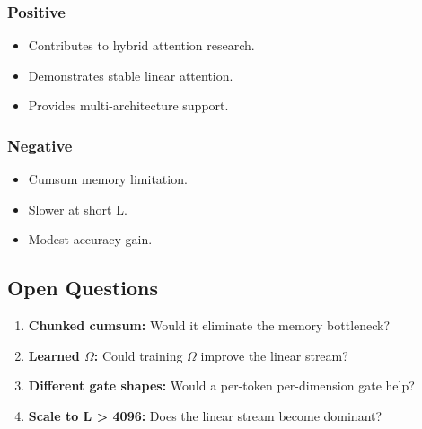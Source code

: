\subsubsection{Positive}
\begin{itemize}
\item Contributes to hybrid attention research.
\item Demonstrates stable linear attention.
\item Provides multi-architecture support.

\end{itemize}
\subsubsection{Negative}
\begin{itemize}
\item Cumsum memory limitation.
\item Slower at short L.
\item Modest accuracy gain.

\end{itemize}
\subsection{Open Questions}

\begin{enumerate}
\item \textbf{Chunked cumsum:} Would it eliminate the memory bottleneck?
\item \textbf{Learned $\Omega$:} Could training $\Omega$ improve the linear stream?
\item \textbf{Different gate shapes:} Would a per-token per-dimension gate help?
\item \textbf{Scale to L > 4096:} Does the linear stream become dominant?

\end{enumerate}
